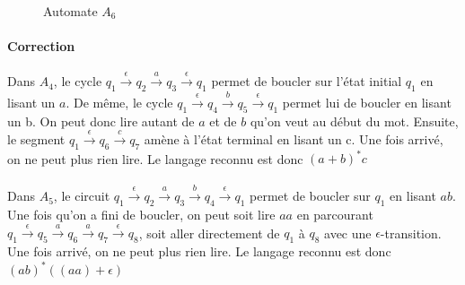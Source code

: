 \documentclass{article}[11pt]
\theoremstyle{definition}
\begin{document}
\newpage

\begin{figure}[!h]
\centering
 
\caption{Automate $A_6$}
\end{figure}


\paragraph*{Correction} Dans $A_4$, le cycle $q_1 \xrightarrow{\epsilon} q_2 \xrightarrow{a} q_3 \xrightarrow{\epsilon} q_1$ permet de boucler sur l'état initial $q_1$ en lisant un $a$. De même, le cycle $q_1 \xrightarrow{\epsilon} q_4 \xrightarrow{b} q_5 \xrightarrow{\epsilon} q_1$ permet lui de boucler en lisant un b. On peut donc lire autant de $a$ et de $b$ qu'on veut au début du mot. Ensuite, le segment $q_1 \xrightarrow{\epsilon} q_6 \xrightarrow{c} q_7$ amène à l'état terminal en lisant un c. Une fois arrivé, on ne peut plus rien lire. Le langage reconnu est donc $(a+b)^*c$

\paragraph*{} Dans $A_5$, le circuit $q_1 \xrightarrow{\epsilon} q_2 \xrightarrow{a} q_3 \xrightarrow{b} q_4 \xrightarrow{\epsilon} q_1$ permet de boucler sur $q_1$ en lisant $ab$. Une fois qu'on a fini de boucler, on peut soit lire $aa$ en parcourant $q_1 \xrightarrow{\epsilon} q_5 \xrightarrow{a} q_6 \xrightarrow{a} q_7 \xrightarrow{\epsilon} q_8$, soit aller directement de $q_1$ à $q_8$ avec une $\epsilon$-transition. Une fois arrivé, on ne peut plus rien lire. Le langage reconnu est donc $(ab)^*((aa)+\epsilon)$
\end{document}
